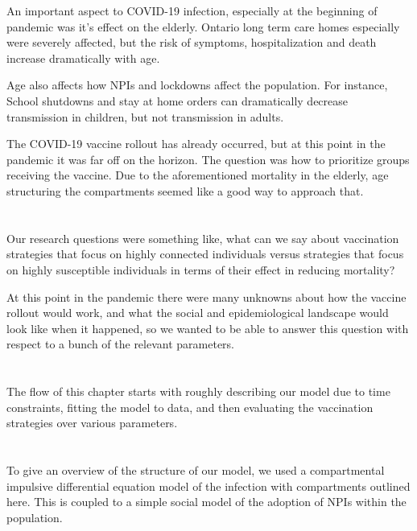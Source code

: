 \documentclass{article}
\begin{document}
An important aspect to COVID-19 infection, especially at the beginning of pandemic was it's effect on the elderly. Ontario long term care homes especially were severely affected, but the risk of symptoms, hospitalization and death increase dramatically with age. 

Age also affects how NPIs and lockdowns affect the population. For instance, School shutdowns and stay at home orders can dramatically decrease transmission in children, but not transmission in adults.  

The COVID-19 vaccine rollout has already occurred, but at this point in the pandemic it was far off on the horizon. The question was how to prioritize groups receiving the vaccine. Due to the aforementioned mortality in the elderly, age structuring the compartments seemed like a good way to approach that. 


\section{}

Our research questions were something like, what can we say about vaccination strategies that focus on highly connected individuals versus strategies that focus on highly susceptible individuals in terms of their effect in reducing mortality?

At this point in the pandemic there were many unknowns about how the vaccine rollout would work, and what the social and epidemiological landscape would look like when it happened, so we wanted to be able to answer this question with respect to a bunch of the relevant parameters.


\section{}

The flow of this chapter starts with roughly describing our model due to time constraints, fitting the model to data, and then evaluating the vaccination strategies over various parameters.


\section{}
To give an overview of the structure of our model, we used a compartmental impulsive differential equation model of the infection with compartments outlined here. This is coupled to a simple social model of the adoption of NPIs within the population.
\end{document}
